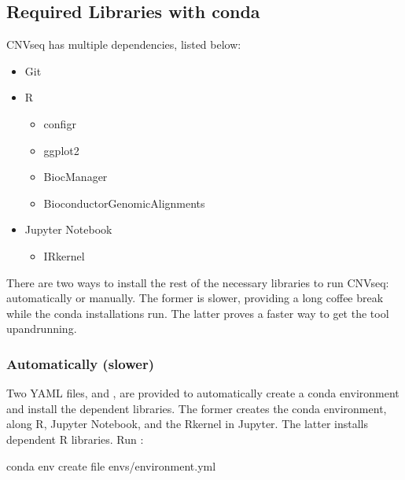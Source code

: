 \documentclass[letterpaper,10pt,english]{sphinxhowto}
\begin{document}
\subsection{Required Libraries with conda}
\label{\detokenize{index:required-libraries-with-conda}}
CNV\sphinxhyphen{}seq has multiple dependencies, listed below:
\begin{itemize}
\item {} 
Git

\item {} 
R
\begin{itemize}
\item {} 
configr

\item {} 
ggplot2

\item {} 
BiocManager

\item {} 
Bioconductor\sphinxhyphen{}GenomicAlignments

\end{itemize}

\item {} 
Jupyter Notebook
\begin{itemize}
\item {} 
IRkernel

\end{itemize}

\end{itemize}

There are two ways to install the rest of the necessary libraries to run CNV\sphinxhyphen{}seq: automatically or manually. The former is slower, providing a long coffee break while the conda installations run. The latter proves a faster way to get the tool up\sphinxhyphen{}and\sphinxhyphen{}running.


\subsubsection{Automatically (slower)}
\label{\detokenize{index:automatically-slower}}
Two YAML files,  and , are provided to automatically create a conda environment and install the dependent libraries. The former creates the conda environment, along R, Jupyter Notebook, and the R\sphinxhyphen{}kernel in Jupyter. The latter installs dependent R libraries. Run :

\begin{sphinxVerbatim}[commandchars=\\\{\}]
\PYGZdl{} conda env create \PYGZhy{}\PYGZhy{}file envs/environment.yml
\end{sphinxVerbatim}
\end{document}
